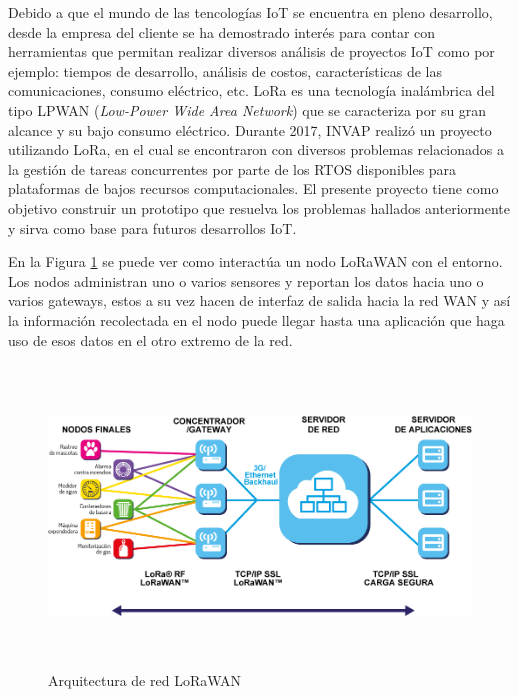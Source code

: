 \documentclass[11pt]{charter}
\begin{document}
Debido a que el mundo de las tencologías IoT se encuentra en pleno desarrollo, desde la empresa del cliente se ha demostrado interés para contar con herramientas que permitan realizar diversos análisis de proyectos IoT como por ejemplo: tiempos de desarrollo, análisis de costos, características de las comunicaciones, consumo eléctrico, etc.
LoRa es una tecnología inalámbrica del tipo LPWAN (\textit{Low-Power Wide Area Network}) que se caracteriza por su gran alcance y su bajo consumo eléctrico. Durante 2017, INVAP realizó un proyecto utilizando LoRa, en el cual se encontraron con diversos problemas relacionados a la gestión de tareas concurrentes por parte de los RTOS disponibles para plataformas de bajos recursos computacionales. 
El presente proyecto tiene como objetivo construir un prototipo que resuelva los problemas hallados anteriormente y sirva como base para futuros desarrollos IoT.

En la Figura \ref{fig:arqLorawan} se puede ver como interactúa un nodo LoRaWAN con el entorno. Los nodos administran uno o varios sensores y reportan los datos hacia uno o varios gateways, estos a su vez hacen de interfaz de salida hacia la red WAN y así la información recolectada en el nodo puede llegar hasta una aplicación que haga uso de esos datos en el otro extremo de la red.

\vspace{25px}

\begin{figure}[htpb]
\centering 
\includegraphics[width=16cm, height=8cm]{./Figuras/nodoLoraWan.png}
\caption{Arquitectura de red LoRaWAN}
\label{fig:arqLorawan}
\end{figure}

\vspace{25px}
\end{document}
